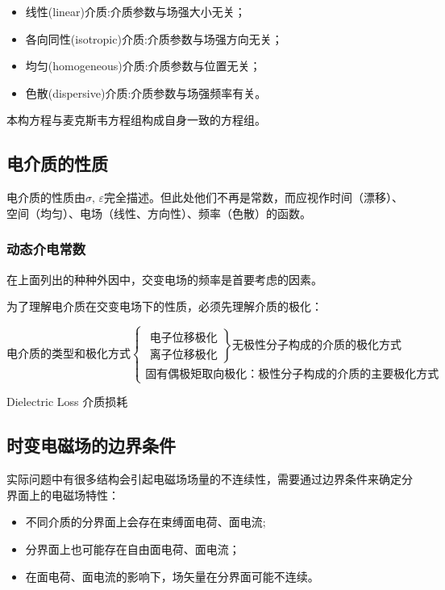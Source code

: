         \begin{itemize}
            \item 线性(linear)介质:介质参数与场强大小无关；
            \item 各向同性(isotropic)介质:介质参数与场强方向无关；
            \item 均匀(homogeneous)介质:介质参数与位置无关；
            \item 色散(dispersive)介质:介质参数与场强频率有关。
        \end{itemize}

        本构方程与麦克斯韦方程组构成自身一致的方程组。

    \subsection{电介质的性质}
        电介质的性质由$\sigma,\,\varepsilon$完全描述。但此处他们不再是常数，而应视作时间（漂移）、空间（均匀）、电场（线性、方向性）、频率（色散）的函数。

    \subsubsection{动态介电常数}

        在上面列出的种种外因中，交变电场的频率是首要考虑的因素。

        为了理解电介质在交变电场下的性质，必须先理解介质的极化：

        \begin{equation*}
        \mbox{电介质的类型和极化方式}
        \begin{cases}
            \left.\begin{array}{l}
                \mbox{电子位移极化}\\
                \mbox{离子位移极化}
            \end{array}\right\rbrace\mbox{无极性分子构成的介质的极化方式}\\
            \mbox{固有偶极矩取向极化：极性分子构成的介质的主要极化方式}
        \end{cases}
        \end{equation*}


        Dielectric Loss 介质损耗
    \subsection{时变电磁场的边界条件}
        实际问题中有很多结构会引起电磁场场量的不连续性，需要通过边界条件来确定分界面上的电磁场特性：
        \begin{itemize}
            \item 不同介质的分界面上会存在束缚面电荷、面电流;
            \item 分界面上也可能存在自由面电荷、面电流；
            \item 在面电荷、面电流的影响下，场矢量在分界面可能不连续。
        \end{itemize}

